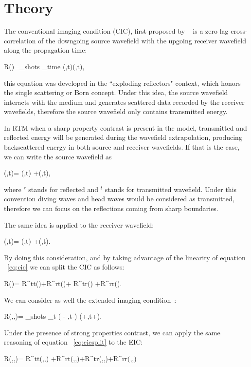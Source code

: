 \section{Theory}

The conventional imaging condition (CIC), first proposed by ~\cite{claerbout:467}
is a zero lag cross-correlation of the downgoing source wavefield with the upgoing 
receiver wavefield along the propagation time:

\beq
R(\xx)=\sum_{shots} \sum_{time} \US(\xx,t)\UR(\xx,t),
\label{eq:cic}
\eeq

this equation was developed in the ``exploding reflectors" context, which honors
the single scattering or Born concept. Under this idea, the source
wavefield interacts with the medium and generates scattered data recorded by
the receiver wavefields, therefore the source wavefield only contains transmitted
energy. 

In RTM when a sharp property contrast is present in the model, transmitted and reflected energy will
be generated during the wavefield extrapolation, producing backscattered energy in both
source and receiver wavefields. If that is the case, we can write the
source wavefield as

\beq
\US(\xx,t)= \USr(\xx,t) +\USt(\xx,t),
\label{eq:ssplit}
\eeq

where $^r$ stands for reflected and $^t$ stands for transmitted wavefield. Under this convention diving
waves and head waves would be considered as transmitted, therefore we can focus on the reflections coming
from sharp boundaries.

The same idea is applied to the receiver wavefield:

\beq
\UR(\xx,t)= \URr(\xx,t) +\URt(\xx,t).
\label{eq:rsplit}
\eeq

By doing this consideration, and by taking advantage of the linearity of equation ~\ref{eq:cic}  we
can split the CIC as follows:

\beq
R(\xx)= R^{tt}(\xx)+R^{rt}(\xx)+ R^{tr}(\xx) +R^{rr}(\xx).
\label{eq:cicsplit}
\eeq

We can consider as well the extended imaging condition~\cite[]{sava:S209}:

\beq
R(\xx,\tau,{\hh})= \sum_{shots} \sum_{t} \US({\xx} - {\hh},t-\tau) \UR(\xx+\hh,t+\tau).
\eeq

Under the presence of strong properties contrast, we can apply the same reasoning of equation ~\ref{eq:cicsplit} to 
the EIC:

\beq
R(\xx,\tau,\hh)= R^{tt}(\xx,\tau,\hh) +R^{rt}(\xx,\tau,\hh)+R^{tr}(\xx,\tau,\hh)+R^{rr}(\xx,\tau,\hh)
\label{eq:eicsplit}
\eeq


